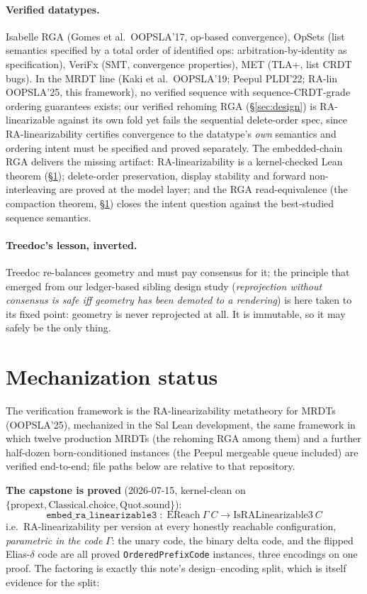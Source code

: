 \documentclass[11pt]{article}
\newcommand{\code}[1]{\texttt{#1}}
\begin{document}
\paragraph{Verified datatypes.} Isabelle RGA (Gomes et al.\ OOPSLA'17,
op-based convergence), OpSets (list semantics specified by a total
order of identified ops: arbitration-by-identity as specification),
VeriFx (SMT, convergence properties), MET (TLA+, list CRDT bugs). In
the MRDT line (Kaki et al.\ OOPSLA'19; Peepul PLDI'22; RA-lin
OOPSLA'25, this framework), no verified sequence with
sequence-CRDT-grade ordering guarantees exists; our verified rehoming
RGA (\S\ref{sec:design}) is RA-linearizable against its own fold yet
fails the sequential delete-order spec, since RA-linearizability
certifies convergence to the datatype's \emph{own} semantics and
ordering intent must be specified and proved separately. The
embedded-chain RGA delivers the missing artifact:
RA-linearizability is a kernel-checked Lean theorem
(\S\ref{sec:mechanization}); delete-order preservation, display
stability and forward non-interleaving are proved at the model layer;
and the RGA read-equivalence (the compaction theorem,
\S\ref{sec:mechanization}) closes the intent question against the
best-studied sequence semantics.

\paragraph{Treedoc's lesson, inverted.} Treedoc re-balances geometry
and must pay consensus for it; the principle that emerged from our
ledger-based sibling design study
(\emph{reprojection without consensus is safe iff geometry has been
demoted to a rendering}) is here taken to its fixed point: geometry is
never reprojected at all. It is immutable, so it may safely be the
only thing.

\section{Mechanization status}
\label{sec:mechanization}

The verification framework is the RA-linearizability metatheory for
MRDTs (OOPSLA'25), mechanized in the Sal Lean development, the
same framework in which twelve production MRDTs (the rehoming RGA
among them) and a further half-dozen born-conditioned instances (the
Peepul mergeable queue included) are verified end-to-end; file paths
below are relative to that repository.

\textbf{The capstone is proved} (2026-07-15, kernel-clean on
$\{\mathrm{propext}, \mathrm{Classical.choice},
\mathrm{Quot.sound}\}$):
\[
  \code{embed\_ra\_linearizable3} \;:\;
  \mathrm{EReach}\ \Gamma\ C \to \mathrm{IsRALinearizable3}\ C
\]
i.e.\ RA-linearizability per version at every honestly reachable
configuration, \emph{parametric in the code} $\Gamma$: the unary
code, the binary delta code, and the flipped Elias-$\delta$ code are
all proved \code{OrderedPrefixCode} instances, three encodings on
one proof. The factoring is exactly this
note's design--encoding split, which is itself evidence for the split:
\end{document}
